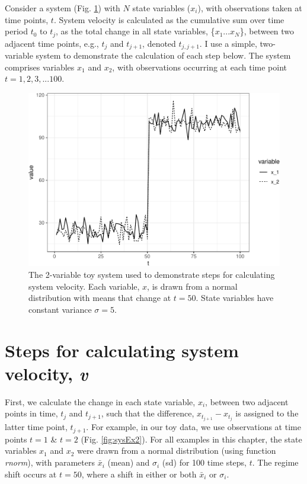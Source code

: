 \documentclass[12pt,twoside,openany]{reedthesis}
\begin{document}
Consider a system (Fig. \ref{fig:sysEx}) with \(N\) state variables (\(x_i\)), with observations taken at time points, \(t\). System velocity is calculated as the cumulative sum over time period \(t_0\) to \(t_j\), as the total change in all state variables, \{\(x_1 ...x_N\)\}, between two adjacent time points, e.g., \(t_j\) and \(t_{j+1}\), denoted \(t_{j,j+1}\). I use a simple, two-variable system to demonstrate the calculation of each step below. The system comprises variables \(x_1\) and \(x_2\), with observations occurring at each time point \(t = {1,2,3,...100}\).
\begin{figure}

{\centering \includegraphics[width=0.95\linewidth]{_myDissertation_files/figure-latex/sysEx-1} 

}

\caption{The 2-variable toy system used to demonstrate steps for calculating system velocity. Each variable, $x$, is drawn from a normal distribution with means that change at $t = 50$. State variables have constant variance $\sigma = 5$. }\label{fig:sysEx}
\end{figure}
\hypertarget{steps-for-calculating-system-velocity-v}{%
\section{\texorpdfstring{Steps for calculating system velocity, \emph{v}}{Steps for calculating system velocity, v}}\label{steps-for-calculating-system-velocity-v}}

First, we calculate the change in each state variable, \(x_i\), between two adjacent points in time, \(t_j\) and \(t_{j+1}\), such that the difference, \(x_{t_{j+1}} - x_{t_j}\) is assigned to the latter time point, \(t_{j+1}\). For example, in our toy data, we use observations at time points \(t = 1\) \& \(t=2\) (Fig. \ref{fig:sysEx2}). For all examples in this chapter, the state variables \(x_1\) and \(x_2\) were drawn from a normal distribution (using function \emph{rnorm}), with parameters \(\bar{x}_i\) (mean) and \(\sigma_i\) (sd) for 100 time steps, \(t\). The regime shift occurs at \(t=50\), where a shift in either or both \(\bar{x}_i\) or \(\sigma_i\).
\end{document}
